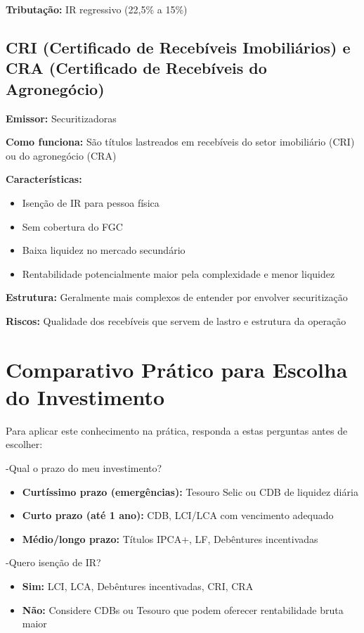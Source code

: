 \textbf{Tributação:} IR regressivo (22,5\% a 15\%)

\subsection{CRI (Certificado de Recebíveis Imobiliários) e CRA (Certificado de Recebíveis do Agronegócio)}
\label{subsec:cri-cra}

\textbf{Emissor:} Securitizadoras

\textbf{Como funciona:} São títulos lastreados em recebíveis do setor imobiliário (CRI) ou do agronegócio (CRA)

\textbf{Características:}
\begin{itemize}
    \item Isenção de IR para pessoa física
    \item Sem cobertura do FGC
    \item Baixa liquidez no mercado secundário
    \item Rentabilidade potencialmente maior pela complexidade e menor liquidez
\end{itemize}

\textbf{Estrutura:} Geralmente mais complexos de entender por envolver securitização

\textbf{Riscos:} Qualidade dos recebíveis que servem de lastro e estrutura da operação

\section{Comparativo Prático para Escolha do Investimento}
\label{sec:comparativo-pratico}

Para aplicar este conhecimento na prática, responda a estas perguntas antes de escolher:

-Qual o prazo do meu investimento?
\begin{itemize}
    \item \textbf{Curtíssimo prazo (emergências):} Tesouro Selic ou CDB de liquidez diária
    \item \textbf{Curto prazo (até 1 ano):} CDB, LCI/LCA com vencimento adequado
    \item \textbf{Médio/longo prazo:} Títulos IPCA+, LF, Debêntures incentivadas
\end{itemize}
-Quero isenção de IR?
\begin{itemize}
    \item \textbf{Sim:} LCI, LCA, Debêntures incentivadas, CRI, CRA
    \item \textbf{Não:} Considere CDBs ou Tesouro que podem oferecer rentabilidade bruta maior
\end{itemize}

